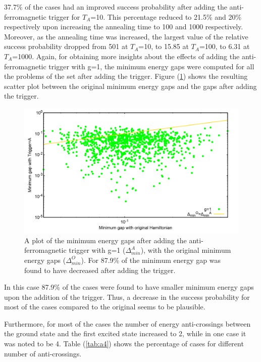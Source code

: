 \documentclass[../main.tex]{subfiles}
\begin{document}
37.7\% of the cases had an improved success probability after adding the anti-ferromagnetic trigger for $T_A$=10. This percentage reduced to 21.5\% and 20\% respectively upon increasing the annealing time to 100 and 1000 respectively. Moreover, as the annealing time was increased, the largest value of the relative success probability dropped from 501 at $T_A$=10, to 15.85 at $T_A$=100, to 6.31 at $T_A$=1000. Again, for obtaining more insights about the effects of adding the anti-ferromagnetic trigger with g=1, the minimum energy gaps were computed for all the problems of the set after adding the trigger. Figure (\ref{fig:a21}) shows the resulting scatter plot between the original minimum energy gaps and the gaps after adding the trigger.

\begin{figure}[H]
\centering 
\includegraphics[scale=0.24]{MinGap_A_g1.png}
\caption{A plot of the minimum energy gaps after adding the anti-ferromagnetic trigger with g=1 ($\Delta_{min}^A$), with the original minimum energy gaps ($\Delta_{min}^O$). For 87.9\% of the minimum energy gap was found to have decreased after adding the trigger.}
\label{fig:a21}
\end{figure}
In this case 87.9\% of the cases were found to have smaller minimum energy gaps upon the addition of the trigger. Thus, a decrease in the success probability for most of the cases compared to the original seems to be plausible.

Furthermore, for most of the cases the number of  energy anti-crossings between the ground state and the first excited state increased to 2, while in one case it was noted to be 4. Table (\ref{tab:a4}) shows the percentage of cases for different number of anti-crossings.
\end{document}
